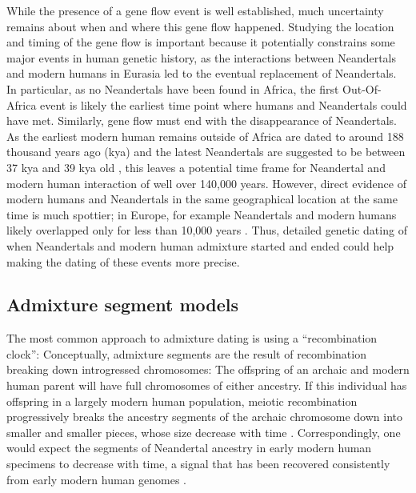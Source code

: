 \documentclass[]{article}
\begin{document}
While the presence of a gene flow event is well established, much uncertainty remains about when and where this gene flow happened. Studying the location and timing of the gene flow is important because it potentially constrains some major events in human genetic history, as the interactions between Neandertals and modern humans in Eurasia led to the eventual replacement of Neandertals. In particular, as no Neandertals have been found in Africa, the first Out-Of-Africa event is likely the earliest time point where humans and Neandertals could have met. Similarly, gene flow must end with the disappearance of Neandertals. As the earliest modern human remains outside of Africa are dated to around 188 thousand years ago (kya)  \citep{stringer_when_2018,hershkovitz_earliest_2018} and the latest Neandertals are suggested to be between 37 kya and 39 kya old \citep{zilhao_precise_2017, higham_timing_2014}, this leaves a potential time frame for Neandertal and modern human interaction of well over 140,000 years. However, direct evidence of modern humans and Neandertals in the same geographical location at the same time is much spottier; in Europe, for example Neandertals and modern humans likely overlapped only for less than 10,000 years \citep{bard_extended_2020}. Thus, detailed genetic dating of when Neandertals and modern human admixture started and ended could help making the dating of these events more precise.

\subsection{Admixture segment models}\label{Admixture models}

The most common approach to admixture dating is using a ``recombination clock'': Conceptually, admixture segments are the result of recombination breaking down introgressed chromosomes: The offspring of an archaic and modern human parent will have full chromosomes of either ancestry. If this individual has offspring in a largely modern human population, meiotic recombination progressively breaks the ancestry segments of the archaic chromosome  down into smaller and smaller pieces, whose size decrease with time \citep{falush_inference_2003, liang_lengths_2014, gravel_population_2012}. Correspondingly, one would expect the segments of Neandertal ancestry in early modern human specimens to decrease with time, a signal that has been recovered consistently from early modern human genomes \citep{fu_genome_2014, moorjani_genetic_2016, sikora_ancient_2017, sikora_population_2019}. 
\end{document}
